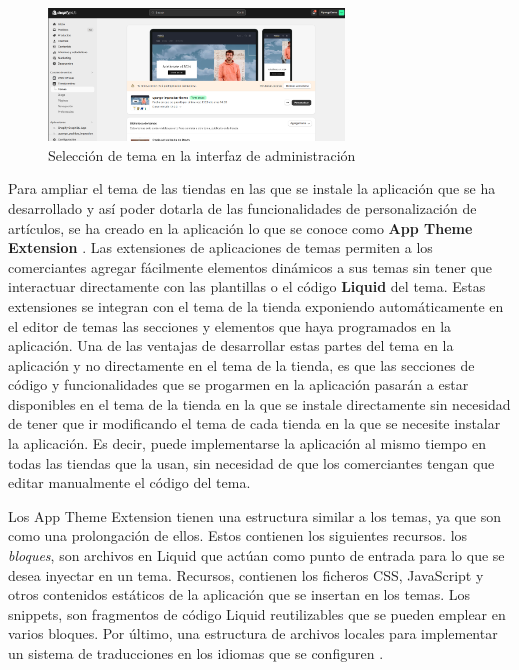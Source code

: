 \documentclass[11pt]{article}
\begin{document}
\begin{figure}[H]
    \centering
    \includegraphics[width=0.7\textwidth]{imagenes/Interfaz de adminsitración elección de tema.png}
    \caption{\label{fig:2}Selección de tema en la interfaz de administración}
    \vspace{\fill}
\end{figure}

Para ampliar el tema de las tiendas en las que se instale la aplicación que se ha desarrollado y así poder dotarla de las funcionalidades de personalización de 
artículos, se ha creado en la aplicación lo que se conoce como \textbf{App Theme Extension} \cite{theme-app-extension}. Las extensiones de aplicaciones de temas permiten a los comerciantes
agregar fácilmente elementos dinámicos a sus temas sin tener que interactuar directamente con las plantillas o el código \textbf{Liquid} del tema. Estas extensiones
se integran con el tema de la tienda exponiendo automáticamente en el editor de temas las secciones y elementos que haya programados en la aplicación. \cite{shopify-dev}
Una de las ventajas de desarrollar estas partes del tema en la aplicación y no directamente en el tema de la tienda, es que las secciones de código y funcionalidades
que se progarmen en la aplicación pasarán a estar disponibles en el tema de la tienda en la que se instale directamente sin necesidad de tener que ir modificando el tema
de cada tienda en la que se necesite instalar la aplicación. Es decir, puede implementarse la aplicación al mismo tiempo en todas las tiendas que la usan,
sin necesidad de que los comerciantes tengan que editar manualmente el código del tema.

Los App Theme Extension tienen una estructura similar a los temas, ya que son como una prolongación de ellos. Estos contienen los siguientes recursos. 
los \textit{bloques}, son archivos en Liquid que actúan como punto de entrada para lo que se desea inyectar en un tema.
Recursos, contienen los ficheros CSS, JavaScript y otros contenidos estáticos de la aplicación que se insertan en los temas.
Los snippets, son fragmentos de código Liquid reutilizables que se pueden emplear en varios bloques. Por último, una estructura de archivos locales
para implementar un sistema de traducciones en los idiomas que se configuren \cite{shopify-dev}. 
\end{document}
